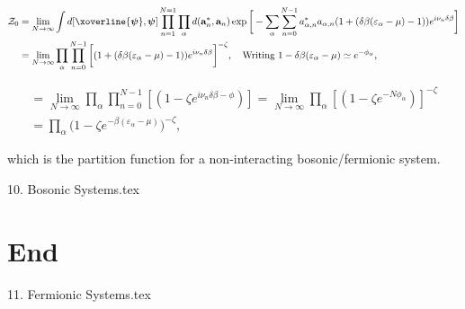 \documentclass{homework}
\begin{document}
\begin{equation}
    \begin{split}
    \mathcal{Z}_0 &= \lim_{N \rightarrow \infty} \int d[\xoverline{\bm{{\psi}}}, \bm{\psi}] 
                \prod_{n=1}^{N=1} \prod_{\alpha}        
                d({\bf a}^{*}_n, {\bf a}_n)
                \exp \bigg[
                    - \sum_{\alpha} \sum_{n = 0}^{N-1}
                        a_{\alpha, n}^{*} a_{\alpha, n} 
                        (1 + (\delta \beta (\varepsilon_{\alpha} - \mu)- 1)) e^{i \nu_n \delta \beta}
                \bigg] \\
    &= \lim_{N \rightarrow \infty} \prod_{\alpha} \prod_{n=0}^{N-1} \bigg[(1 + (\delta \beta (\varepsilon_{\alpha} - \mu)- 1)) e^{i \nu_n \delta \beta}\bigg]^{-\zeta}, \quad \textnormal{Writing $1 - \delta \beta (\varepsilon_{\alpha} - \mu) \simeq e^{- \phi_{\alpha}}$}, 
    \end{split}
\end{equation}

\begin{equation*}
    \begin{split}
    = \lim_{N \rightarrow \infty} \prod_{\alpha} \prod_{n=0}^{N-1} [(1 - \zeta e^{i \nu_n \delta \beta - \phi} )] = \lim_{N \rightarrow \infty}
        \prod_{\alpha} 
        [(1 - \zeta e^{-N \phi_{\alpha}})]^{-\zeta} \\
    = \prod_{\alpha} \bigg(1- \zeta e^{-\beta (\varepsilon_{\alpha} - \mu)} \bigg)^{-\zeta},
    \end{split}
\end{equation*}

which is the partition function for a non-interacting bosonic/fermionic system. 

{10. Bosonic Systems.tex}
\fi

\section{End}
\clearpage

{11. Fermionic Systems.tex}

\clearpage


\end{document}
